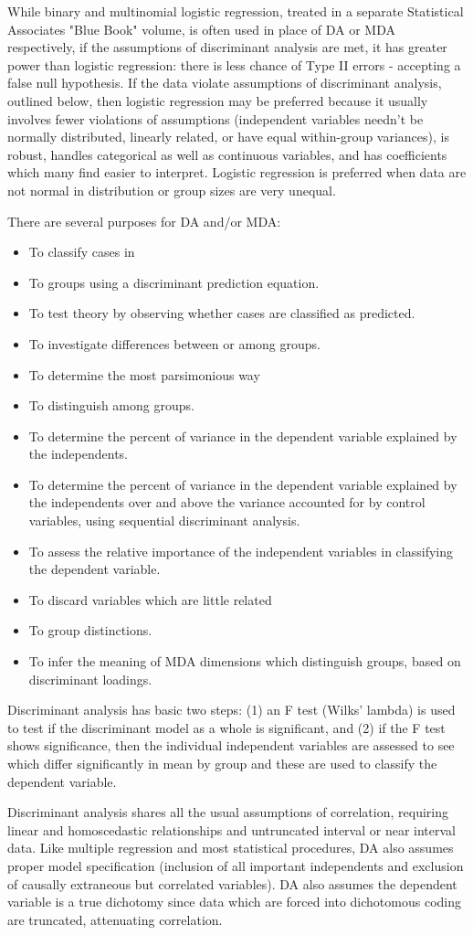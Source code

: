 While binary and multinomial logistic regression, treated in a separate Statistical Associates "Blue Book" volume, is often used in place of DA or MDA respectively, if the assumptions of discriminant analysis are met, it has greater power than logistic regression: there is less chance of Type II errors - accepting a false null hypothesis. If the data violate assumptions of discriminant analysis, outlined below, then logistic regression may be preferred because it usually involves fewer violations of assumptions (independent variables needn't be normally distributed, linearly related, or have equal within-group variances), is robust, handles categorical as well as continuous variables, and has coefficients which many find easier to interpret. Logistic regression is preferred when data are not normal in distribution or group sizes are very unequal.

There are several purposes for DA and/or MDA:
\begin{itemize}
\item To classify cases in\item To groups using a discriminant prediction equation.
\item To test theory by observing whether cases are classified as predicted.
\item To investigate differences between or among groups.
\item To determine the most parsimonious way \item To distinguish among groups.
\item To determine the percent of variance in the dependent variable explained by the independents.
\item To determine the percent of variance in the dependent variable explained by the independents over and above the variance accounted for by control variables, using sequential discriminant analysis.
\item To assess the relative importance of the independent variables in classifying the dependent variable.
\item To discard variables which are little related \item To group distinctions.
\item To infer the meaning of MDA dimensions which distinguish groups, based on discriminant loadings.
\end{itemize}
Discriminant analysis has basic two steps: (1) an F test (Wilks' lambda) is used to test if the discriminant model as a whole is significant, and (2) if the F test shows significance, then the individual independent variables are assessed to see which differ significantly in mean by group and these are used to classify the dependent variable.

Discriminant analysis shares all the usual assumptions of correlation, requiring linear and homoscedastic relationships and untruncated interval or near interval data. Like multiple regression and most statistical procedures, DA also assumes proper model specification (inclusion of all important independents and exclusion of causally extraneous but correlated variables). DA also assumes the dependent variable is a true dichotomy since data which are forced into dichotomous coding are truncated, attenuating correlation.
